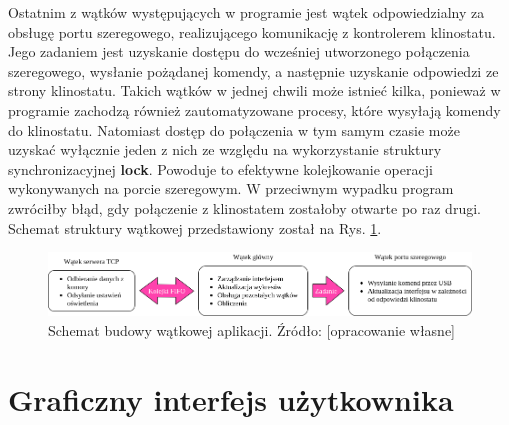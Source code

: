 Ostatnim z wątków występujących w programie jest wątek odpowiedzialny za obsługę portu szeregowego, realizującego komunikację z kontrolerem klinostatu. Jego zadaniem jest uzyskanie dostępu do wcześniej utworzonego połączenia szeregowego, wysłanie pożądanej komendy, a następnie uzyskanie odpowiedzi ze strony klinostatu. Takich wątków w jednej chwili może istnieć kilka, ponieważ w programie zachodzą również zautomatyzowane procesy, które wysyłają komendy do klinostatu. Natomiast dostęp do połączenia w tym samym czasie może uzyskać wyłącznie jeden z nich ze względu na wykorzystanie struktury synchronizacyjnej \textbf{lock}. Powoduje to efektywne kolejkowanie operacji wykonywanych na porcie szeregowym. W przeciwnym wypadku program zwróciłby błąd, gdy połączenie z klinostatem zostałoby otwarte po raz drugi. Schemat struktury wątkowej przedstawiony został na Rys. \ref{fig:watki}.

\begin{figure}
	
	\centering
	\includegraphics[scale=0.46]{schemat_watki}
	\caption{Schemat budowy wątkowej aplikacji. Źródło: [opracowanie własne]} 
	\label{fig:watki}
	
\end{figure}

\section{Graficzny interfejs użytkownika}

